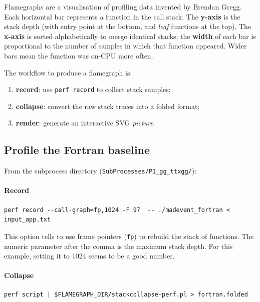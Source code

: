 \documentclass[11pt,a4paper]{article}
\begin{document}
Flamegraphs are a visualisation of profiling data invented by Brendan Gregg.
Each horizontal bar represents a function in the call stack.
The \textbf{y-axis} is the stack depth (with entry point at the bottom, and \emph{leaf} functions at the top).
The \textbf{x-axis} is sorted alphabetically to merge identical stacks; the \textbf{width} of each bar is proportional to the number of samples in which that function appeared.
Wider bars mean the function was on-CPU more often.

The workflow to produce a flamegraph is:
\begin{enumerate}[nosep]
    \item \textbf{record}: use \texttt{perf record} to collect stack samples;
    \item \textbf{collapse}: convert the raw stack traces into a folded format;
    \item \textbf{render}: generate an interactive SVG \emph{picture}.
\end{enumerate}

\subsection{Profile the Fortran baseline}
\label{sec:profile_fortran}

From the subprocess directory (\texttt{SubProcesses/P1\_gg\_ttxgg/}):

\paragraph{Record}

\begin{lstlisting}[style=bashstyle]
perf record --call-graph=fp,1024 -F 97  -- ./madevent_fortran < input_app.txt
\end{lstlisting}

\begin{tipbox}[What does \texttt{--call-graph=fp,1024} do?]
This option tells \perf to use frame pointers (\texttt{fp}) to rebuild the stack of functions.
The numeric parameter after the comma is the maximum stack depth.
For this example, setting it to 1024 seems to be a good number.
\end{tipbox}

\paragraph{Collapse}

\begin{lstlisting}[style=bashstyle]
perf script | $FLAMEGRAPH_DIR/stackcollapse-perf.pl > fortran.folded
\end{lstlisting}
\end{document}
